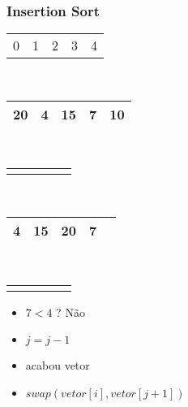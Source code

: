 \documentclass{beamer}
\begin{document}
\begin{frame}
    \frametitle{Insertion Sort}
    \begin{center}
        \begin{table}
            \begin{tabular}{p{0.25cm} p{0.25cm} p{0.25cm} p{0.25cm} p{0.25cm}}
                0 & 1 & 2 & 3 & 4
            \end{tabular} \\
            \begin{tabular}{| p{0.25cm} | p{0.25cm} | p{0.25cm} | p{0.25cm} | p{0.25cm} |}
                \hline
                20 & 4 & 15 & 7 & 10 \\ \hline
            \end{tabular} \\
            \begin{tabular}{p{0.25cm} p{0.25cm} p{0.25cm} p{0.25cm} p{0.25cm}}
                & & & \color{blue}{$\updownarrow$} &
            \end{tabular} \\
            \begin{tabular}{| p{0.25cm} | p{0.25cm} | p{0.25cm} | p{0.25cm} | p{0.25cm} |}
                \hline
                4 & 15 & 20 & 7 & \\ \hline
            \end{tabular} \\
            \begin{tabular}{p{0.25cm} p{0.25cm} p{0.25cm} p{0.25cm} p{0.25cm}}
                 \color{red}{$\uparrow$} & & & \color{blue}{$\uparrow$} &
            \end{tabular}
        \end{table}
	\end{center}
    \begin{itemize}[<+->]
        \item $7 < 4$ ? Não
        \item $j = j - 1$
        \item acabou vetor
        \item $swap(vetor[i], vetor[j + 1])$
    \end{itemize}
\end{frame}
\end{document}

